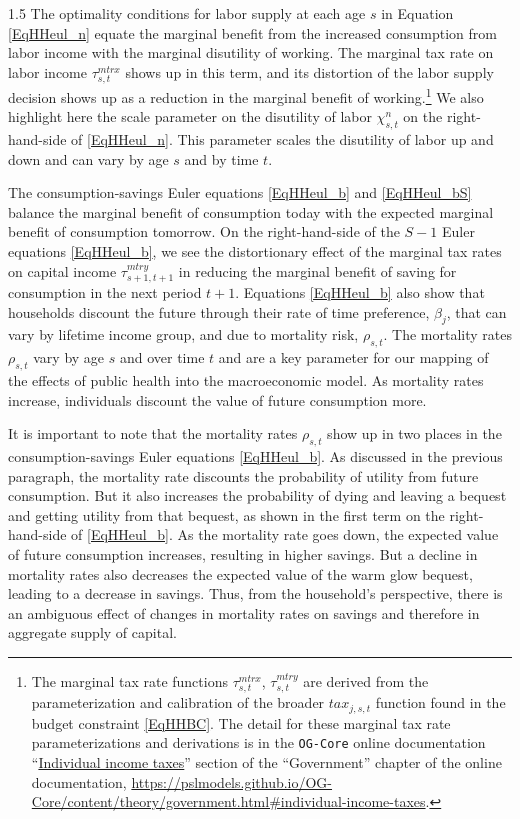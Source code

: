 \documentclass[letterpaper,12pt]{article}
\theoremstyle{definition}
\begin{document}
\begin{spacing}{1.5}
    The optimality conditions for labor supply at each age $s$ in Equation \eqref{EqHHeul_n} equate the marginal benefit from the increased consumption from labor income with the marginal disutility of working. The marginal tax rate on labor income $\tau^{mtrx}_{s,t}$ shows up in this term, and its distortion of the labor supply decision shows up as a reduction in the marginal benefit of working.\footnote{The marginal tax rate functions $\tau^{mtrx}_{s,t}$, $\tau^{mtry}_{s,t}$ are derived from the parameterization and calibration of the broader $tax_{j,s,t}$ function found in the budget constraint \eqref{EqHHBC}. The detail for these marginal tax rate parameterizations and derivations is in the \texttt{OG-Core} online documentation ``\href{https://pslmodels.github.io/OG-Core/content/theory/government.html\#individual-income-taxes}{Individual income taxes}'' section of the ``Government'' chapter of the online documentation, \href{https://pslmodels.github.io/OG-Core/content/theory/government.html\#individual-income-taxes}{https://pslmodels.github.io/OG-Core/content/theory/government.html\#individual-income-taxes}.} We also highlight here the scale parameter on the disutility of labor $\chi^n_{s,t}$ on the right-hand-side of \eqref{EqHHeul_n}. This parameter scales the disutility of labor up and down and can vary by age $s$ and by time $t$.

    The consumption-savings Euler equations \eqref{EqHHeul_b} and \eqref{EqHHeul_bS} balance the marginal benefit of consumption today with the expected marginal benefit of consumption tomorrow. On the right-hand-side of the $S-1$ Euler equations \eqref{EqHHeul_b}, we see the distortionary effect of the marginal tax rates on capital income $\tau^{mtry}_{s+1,t+1}$ in reducing the marginal benefit of saving for consumption in the next period $t+1$. Equations \eqref{EqHHeul_b} also show that households discount the future through their rate of time preference, $\beta_j$, that can vary by lifetime income group, and due to mortality risk, $\rho_{s,t}$. The mortality rates $\rho_{s,t}$ vary by age $s$ and over time $t$ and are a key parameter for our mapping of the effects of public health into the macroeconomic model. As mortality rates increase, individuals discount the value of future consumption more.

    It is important to note that the mortality rates $\rho_{s,t}$ show up in two places in the consumption-savings Euler equations \eqref{EqHHeul_b}. As discussed in the previous paragraph, the mortality rate discounts the probability of utility from future consumption. But it also increases the probability of dying and leaving a bequest and getting utility from that bequest, as shown in the first term on the right-hand-side of \eqref{EqHHeul_b}. As the mortality rate goes down, the expected value of future consumption increases, resulting in higher savings. But a decline in mortality rates also decreases the expected value of the warm glow bequest, leading to a decrease in savings. Thus, from the household's perspective, there is an ambiguous effect of changes in mortality rates on savings and therefore in aggregate supply of capital.


\end{spacing}
\end{document}
